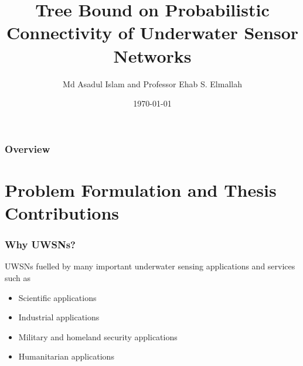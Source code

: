 \documentclass{beamer}
\title[Prob. Connectivity of USN]{Tree Bound on Probabilistic Connectivity of Underwater Sensor Networks} %
\author{Md Asadul Islam and Professor Ehab S. Elmallah} %
\institute[UofA] %
{
University of Alberta \\ %
\medskip
\textit{\{mdasadul,elmallah\}@ualberta.ca} %
}
\date{\today} %
\begin{document}
\begin{frame}
\titlepage %
\end{frame}

\begin{frame}
\frametitle{Overview} %
\tableofcontents %
\end{frame}

\section{Problem Formulation and Thesis Contributions}


\begin{frame}
\frametitle{Why UWSNs?}
UWSNs fuelled by many important underwater sensing applications and services such as

\begin{itemize}
\item Scientific applications
\item Industrial applications
\item Military and homeland security applications
\item Humanitarian applications
\end{itemize}
\end{frame}

\end{document}

